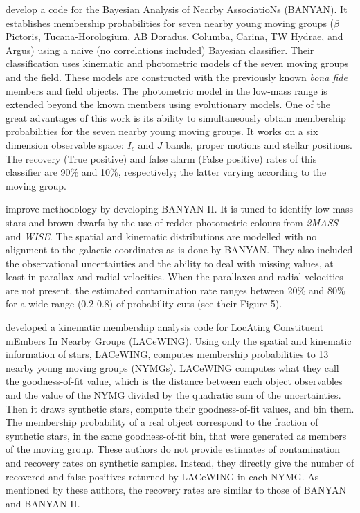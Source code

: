 \citet{Malo2013} develop a code for the Bayesian Analysis of Nearby AssociatioNs (BANYAN). It establishes membership probabilities for seven nearby young moving groups ($\beta$ Pictoris, Tucana-Horologium, AB Doradus, Columba, Carina, TW Hydrae, and Argus) using a naive (no correlations included) Bayesian classifier. Their classification uses kinematic and photometric models of the seven moving groups and the field. These models are constructed with the previously known \emph{bona fide} members and field objects. The photometric model in the low-mass range is extended beyond the known members using evolutionary models. One of the great advantages of this work is its ability to simultaneously obtain membership probabilities for the seven nearby young moving groups. It works on a six dimension observable space: $I_c$ and $J$ bands, proper motions and stellar positions. The recovery (True positive) and false alarm (False positive) rates of this classifier are 90\% and 10\%, respectively; the latter varying according to the moving group.

\citet{Gagne2014} improve \citet{Malo2013} methodology by developing BANYAN-II. It is tuned to  identify low-mass stars and brown dwarfs by the use of redder photometric colours from \emph{2MASS} and \emph{WISE}. The spatial and kinematic distributions are modelled with no alignment to the galactic coordinates as is done by BANYAN. They also included the observational uncertainties and the ability to deal with missing values, at least in parallax and radial velocities. When the parallaxes and radial velocities are not present, the estimated contamination rate ranges between 20\% and 80\% for a wide range (0.2-0.8) of probability cuts (see their Figure 5).

\citet{Riedel2017} developed a kinematic membership analysis code for LocAting Constituent mEmbers In Nearby Groups (LACeWING). Using only the spatial and kinematic information of stars, LACeWING, computes membership probabilities to 13 nearby young moving groups (NYMGs). LACeWING computes what they call the goodness-of-fit value, which is the distance between each object observables and the value of the NYMG divided by the quadratic sum of the uncertainties. Then it draws synthetic stars, compute their goodness-of-fit values, and bin them. The membership probability of a real object correspond to the fraction of synthetic stars, in the same goodness-of-fit bin, that were generated as members of the moving group. These authors do not provide estimates of contamination and recovery rates on synthetic samples. Instead, they directly give the number of recovered and false positives returned by LACeWING in each NYMG. As mentioned by these authors, the recovery rates are similar to those of BANYAN and BANYAN-II. 


